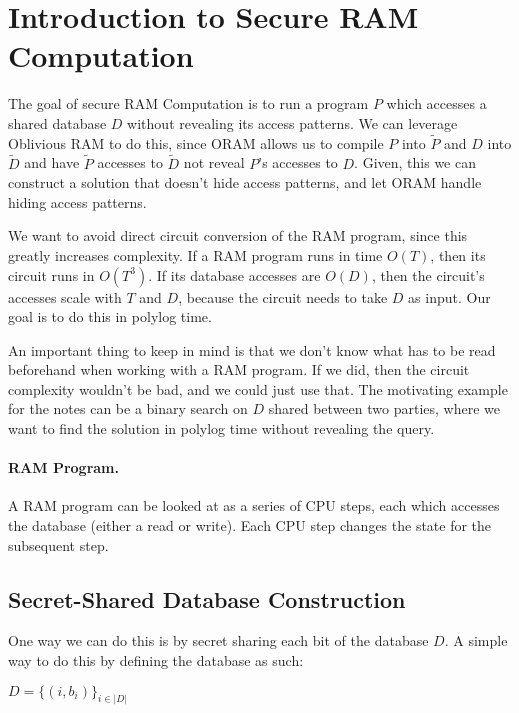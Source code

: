 
\section{Introduction to Secure RAM Computation}
The goal of secure RAM Computation is to run a program $P$ which accesses a shared database $D$ without revealing its access patterns. We can leverage Oblivious RAM to do this, since ORAM allows us to compile $P$ into $\widetilde{P}$ and $D$ into $\widetilde{D}$ and have $\widetilde{P}$ accesses to $\widetilde{D}$ not reveal $P$'s accesses to $D$. Given, this we can construct a solution that doesn't hide access patterns, and let ORAM handle hiding access patterns. 

We want to avoid direct circuit conversion of the RAM program, since this greatly increases complexity. If a RAM program runs in time $O(T)$, then its circuit runs in $O(T^{3})$. If its database accesses are $O(D)$, then the circuit's accesses scale with $T$ and $D$, because the circuit needs to take $D$ as input. Our goal is to do this in polylog time.

An important thing to keep in mind is that we don't know what has to be read beforehand when working with a RAM program. If we did, then the circuit complexity wouldn't be bad, and we could just use that. The motivating example for the notes can be a binary search on $D$ shared between two parties, where we want to find the solution in polylog time without revealing the query.

\paragraph{RAM Program.}
A RAM program can be looked at as a series of CPU steps, each which accesses the database (either a read or write). Each CPU step changes the state for the subsequent step.

\subsection{Secret-Shared Database Construction}
One way we can do this is by secret sharing each bit of the database $D$. A simple way to do this by defining the database as such:
\begin{definition}
$D = \{(i, b_{i})\}_{i \in |D|}$
\end{definition}

